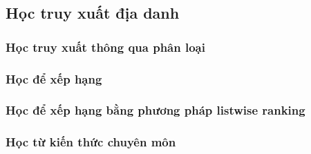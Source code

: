 \subsection{Học truy xuất địa danh}

\subsubsection{Học truy xuất thông qua phân loại}

\subsubsection{Học để xếp hạng}

\subsubsection{Học để xếp hạng bằng phương pháp listwise ranking}

\subsubsection{Học từ kiến thức chuyên môn}
